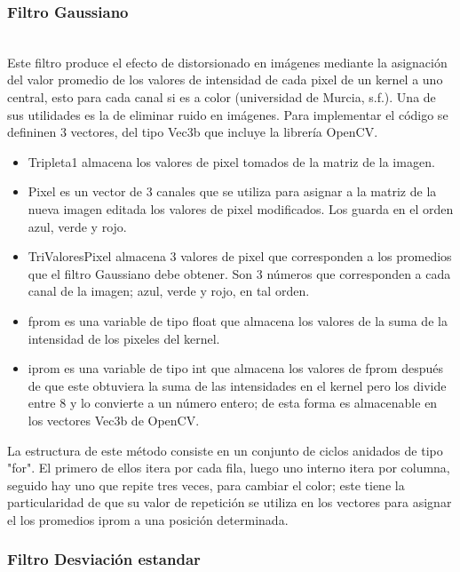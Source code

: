 \documentclass[11pt]{article}
\begin{document}
\subsubsection{Filtro Gaussiano}\\

Este filtro produce el efecto de distorsionado en imágenes mediante la asignación del valor promedio de los valores de intensidad de cada pixel de un kernel a uno central, esto para cada canal si es a color  (universidad de Murcia, s.f.). Una de sus utilidades es la de eliminar ruido en imágenes. Para implementar el código se defininen 3 vectores, del tipo Vec3b que incluye la librería OpenCV.\\

\begin{itemize}
    \item Tripleta1 almacena los valores de pixel tomados de la matriz de la imagen.
    \item Pixel es un vector de 3 canales que se utiliza para asignar a la matriz de la nueva imagen editada los valores de pixel modificados. Los guarda en el orden azul, verde y rojo.
    \item TriValoresPixel almacena 3 valores de pixel que corresponden a los promedios que el filtro Gaussiano debe obtener. Son 3 números que corresponden a cada canal de la imagen; azul, verde y rojo, en tal orden.
    \item fprom es una variable de tipo float que almacena los valores de la suma de la intensidad de los pixeles del kernel.
    \item iprom es una variable de tipo int que almacena los valores de fprom después de que este obtuviera la suma de las intensidades en el kernel pero los divide entre 8 y lo convierte a un número entero; de esta forma es almacenable en los vectores Vec3b de OpenCV.
\end{itemize}

La estructura de este método consiste en un conjunto de ciclos anidados de tipo "for". El primero de ellos itera por cada fila, luego uno interno itera por columna, seguido hay uno que repite tres veces, para cambiar el color; este tiene la particularidad de que su valor de repetición se utiliza en los vectores para asignar el los promedios iprom a una posición determinada.

\subsubsection{Filtro Desviación estandar}\\
\end{document}
